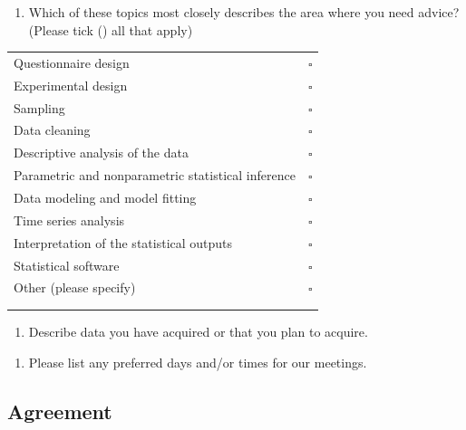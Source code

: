 \documentclass[
  a4paper]{article}
\providecommand{\tightlist}{%
  \setlength{\itemsep}{0pt}\setlength{\parskip}{0pt}}
\begin{document}
\newpage

\begin{enumerate}
\def\labelenumi{\arabic{enumi}.}
\setcounter{enumi}{4}
\tightlist
\item
  Which of these topics most closely describes the area where you need
  advice? (Please tick (\checkmark) all that apply)
\end{enumerate}

\begin{table}[!h]
\center
\begin{tabular}{l|l}
\hline
Questionnaire design & $\square$ \\ 
Experimental design &  $\square$  \\ 
Sampling  &   $\square$ \\
Data cleaning &  $\square$\\
Descriptive analysis of the data &  $\square$\\
Parametric and nonparametric statistical inference &  $\square$\\
Data modeling and model fitting &  $\square$ \\
Time series analysis &  $\square$ \\
Interpretation of the statistical outputs &  $\square$\\
Statistical software &  $\square$\\
Other (please specify) &  $\square$\\
 &  \\
 &  \\
\hline
\end{tabular}
\end{table}

\begin{enumerate}
\def\labelenumi{\arabic{enumi}.}
\setcounter{enumi}{5}
\tightlist
\item
  Describe data you have acquired or that you plan to acquire.
\end{enumerate}

\vspace{3cm}

\begin{enumerate}
\def\labelenumi{\arabic{enumi}.}
\setcounter{enumi}{6}
\tightlist
\item
  Please list any preferred days and/or times for our meetings.
\end{enumerate}

\vspace{1cm}

\hypertarget{agreement}{%
\subsection{Agreement}\label{agreement}}
\end{document}
